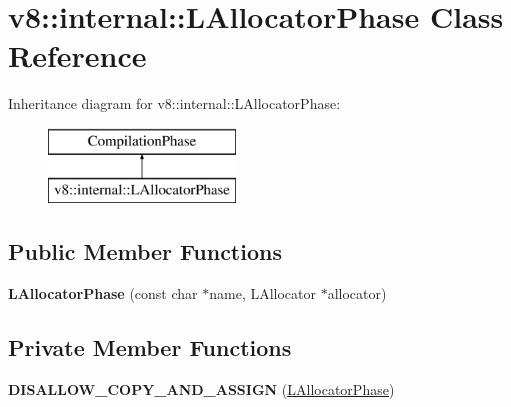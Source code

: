 \hypertarget{classv8_1_1internal_1_1_l_allocator_phase}{}\section{v8\+:\+:internal\+:\+:L\+Allocator\+Phase Class Reference}
\label{classv8_1_1internal_1_1_l_allocator_phase}
Inheritance diagram for v8\+:\+:internal\+:\+:L\+Allocator\+Phase\+:\begin{figure}[H]
\begin{center}
\leavevmode
\includegraphics[height=2.000000cm]{classv8_1_1internal_1_1_l_allocator_phase}
\end{center}
\end{figure}
\subsection*{Public Member Functions}
\begin{DoxyCompactItemize}
\item 
{\bfseries L\+Allocator\+Phase} (const char $\ast$name, L\+Allocator $\ast$allocator)\hypertarget{classv8_1_1internal_1_1_l_allocator_phase_ab20de2aa106216356743f3ff26346e51}{}\label{classv8_1_1internal_1_1_l_allocator_phase_ab20de2aa106216356743f3ff26346e51}

\end{DoxyCompactItemize}
\subsection*{Private Member Functions}
\begin{DoxyCompactItemize}
\item 
{\bfseries D\+I\+S\+A\+L\+L\+O\+W\+\_\+\+C\+O\+P\+Y\+\_\+\+A\+N\+D\+\_\+\+A\+S\+S\+I\+GN} (\hyperlink{classv8_1_1internal_1_1_l_allocator_phase}{L\+Allocator\+Phase})\hypertarget{classv8_1_1internal_1_1_l_allocator_phase_ab580978495f20a53cf55359c9b9bc774}{}\label{classv8_1_1internal_1_1_l_allocator_phase_ab580978495f20a53cf55359c9b9bc774}

\end{DoxyCompactItemize}
